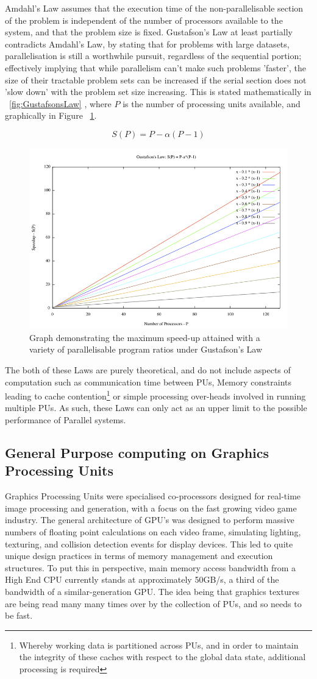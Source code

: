 Amdahl's Law assumes that the execution time of the non-parallelisable section of the problem is independent of the number of processors available to the system, and that the problem size is fixed. Gustafson's Law\cite{JLG88} at least partially contradicts Amdahl's Law, by stating that for problems with large datasets, parallelisation is still a worthwhile pursuit, regardless of the sequential portion; effectively implying that while parallelism can't make such problems 'faster', the size of their tractable problem sets can be increased if the serial section does not 'slow down' with the problem set size increasing. This is stated mathematically in ~\eqref{fig:GustafsonsLaw} , where \(P\) is the number of processing units available, and graphically in Figure ~\ref{fig:GustafsonFigure}.

\begin{equation}\label{fig:GustafsonsLaw}
S(P)=P-\alpha(P-1)
\end{equation}

\begin{figure}[h!]
  \centering
  \includegraphics[width=0.\textwidth,keepaspectratio=true]{images/GustafsonsLaw.png}
  \caption{Graph demonstrating the maximum speed-up attained with a variety of parallelisable program ratios under Gustafson's Law}
  \label{fig:GustafsonFigure}
\end{figure}

The both of these Laws are purely theoretical, and do not include aspects of computation such as communication time between PUs, Memory constraints leading to cache contention\footnote{Whereby working data is partitioned across PUs, and in order to maintain the integrity of these caches with respect to the global data state, additional processing is required} or simple processing over-heads involved in running multiple PUs. As such, these Laws can only act as an upper limit to the possible performance of Parallel systems.

\subsection{General Purpose computing on Graphics Processing Units}
\label{sec:GPGPU}
Graphics Processing Units were specialised co-processors designed for real-time image processing and generation, with a focus on the fast growing video game industry. The general architecture of GPU's was designed to perform massive numbers of floating point calculations on each video frame, simulating lighting, texturing, and collision detection events for display devices. This led to quite unique design practices in terms of memory management and execution structures. To put this in perspective, main memory access bandwidth from a High End CPU currently stands at approximately 50GB/s\cite{Var11}, a third of the bandwidth of a similar-generation GPU\cite{NC10}. The idea being that graphics textures are being read many many times over by the collection of PUs, and so needs to be fast.

